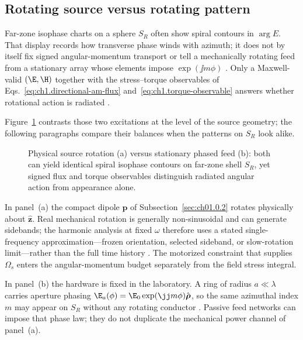 \subsection{Rotating source versus rotating pattern}
\label{sec:ch01.2.0}

Far-zone isophase charts on a sphere $S_R$ often show spiral contours in $\arg E$. That display records how transverse phase winds with azimuth; it does not by itself fix signed angular-momentum transport or tell a mechanically rotating feed from a stationary array whose elements impose $\exp(\jj m\phi)$ \cite{beth1936,harrington2001}. Only a Maxwell-valid $(\E,\H)$ together with the stress--torque observables of Eqs.~\eqref{eq:ch1.directional-am-flux} and~\eqref{eq:ch1.torque-observable} answers whether rotational action is radiated \cite{stratton1941,beth1936}.

Figure~\ref{fig:ch1.signature-rotation-duality} contrasts those two excitations at the level of the source geometry; the following paragraphs compare their balances when the patterns on $S_R$ look alike.

\begin{figure}[t]
\centering
\VolIPhysFig{\VolIPhysRotationDuality}
\caption{Physical source rotation (a) versus stationary phased feed (b): both can yield identical spiral isophase contours on far-zone shell $S_R$, yet signed flux and torque observables distinguish radiated angular action from appearance alone.}
\label{fig:ch1.signature-rotation-duality}
\end{figure}

In panel~(a) the compact dipole \(\mathbf{p}\) of Subsection~\ref{sec:ch01.0.2} rotates physically about \(\hat{\mathbf{z}}\). Real mechanical rotation is generally non-sinusoidal and can generate sidebands; the harmonic analysis at fixed \(\omega\) therefore uses a stated single-frequency approximation---frozen orientation, selected sideband, or slow-rotation limit---rather than the full time history \cite{stratton1941}. The motorized constraint that supplies \(\Omega_s\) enters the angular-momentum budget separately from the field stress integral.

In panel~(b) the hardware is fixed in the laboratory. A ring of radius \(a\ll\lambda\) carries aperture phasing \(\E_a(\phi)=\E_0\exp(\jj m\phi)\hat{\boldsymbol{\rho}}\), so the same azimuthal index \(m\) may appear on $S_R$ without any rotating conductor \cite{harrington2001}. Passive feed networks can impose that phase law; they do not duplicate the mechanical power channel of panel~(a).

